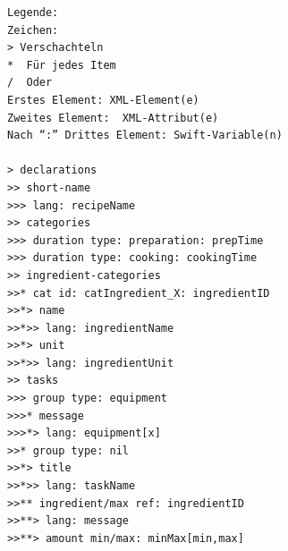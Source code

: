 \documentclass[12pt]{article}
\begin{document}
\begin{lstlisting}[caption={XML-Skizze},label={lst:xmlSketch}]
Legende:
Zeichen:
> Verschachteln
*  Für jedes Item
/  Oder
Erstes Element: XML-Element(e)
Zweites Element:  XML-Attribut(e)
Nach “:” Drittes Element: Swift-Variable(n)

> declarations
>> short-name
>>> lang: recipeName
>> categories
>>> duration type: preparation: prepTime
>>> duration type: cooking: cookingTime
>> ingredient-categories
>>* cat id: catIngredient_X: ingredientID
>>*> name
>>*>> lang: ingredientName
>>*> unit
>>*>> lang: ingredientUnit
>> tasks
>>> group type: equipment
>>>* message
>>>*> lang: equipment[x]
>>* group type: nil
>>*> title
>>*>> lang: taskName
>>** ingredient/max ref: ingredientID
>>**> lang: message
>>**> amount min/max: minMax[min,max]
\end{lstlisting}
\end{document}

